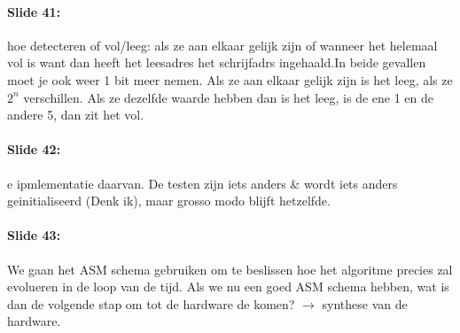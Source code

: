 \documentclass[10pt,a4paper]{book}
\begin{document}
\paragraph{Slide 41:} hoe detecteren of vol/leeg: als ze aan elkaar gelijk zijn of wanneer het helemaal vol is want dan heeft het leesadres het schrijfadrs ingehaald.In beide gevallen moet je ook weer 1 bit meer nemen. Als ze aan elkaar gelijk zijn is het leeg, als ze $2^n$ verschillen. Als ze dezelfde waarde hebben dan is het leeg, is de ene 1 en de andere 5, dan zit het vol.

\paragraph{Slide 42:} e ipmlementatie daarvan. De testen zijn iets anders \& wordt iets anders geinitialiseerd (Denk ik), maar grosso modo blijft hetzelfde.

\paragraph{Slide 43:} We gaan het ASM schema gebruiken om te beslissen hoe het algoritme precies zal evolueren in de loop van de tijd. Als we nu een goed ASM schema hebben, wat is dan de volgende stap om tot de hardware de komen? $\rightarrow$ synthese van de hardware. 
\end{document}

